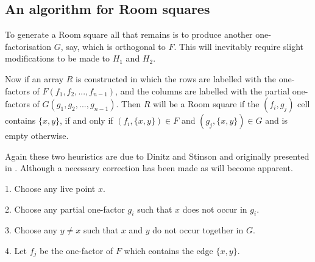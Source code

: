 \documentclass[
  11pt,
  a4paper]{book}\usepackage[]{graphicx}\usepackage[]{xcolor}
\begin{document}
\subsection{An algorithm for Room squares}

To generate a Room square all that remains is to produce
another one-factorisation $G$, say, which is orthogonal to
$F$. This will inevitably require slight modifications to
be made to $H_1$ and $H_2$.

Now if an array $R$ is constructed in which the rows are
labelled with the one-factors of $F(f_1,f_2,...,f_{n-1})$,
and the columns are labelled with the partial one-factors
of $G(g_1,g_2,...,g_{n-1})$. Then $R$ will be a Room square
if the $(f_i,g_j)$ cell contains $\{x,y\}$, if and only if
$(f_i,\{x,y\}) \in F$ and $(g_j,\{x,y\}) \in G$ and is empty
otherwise.

Again these two heuristics are due to Dinitz and Stinson and
originally presented in
\cite{dinitzHillClimbingAlgorithmConstruction1987}.
Although a necessary correction has been made as will
become apparent.

\begin{algorithm}[H]
  1. Choose any live point $x$.

  2. Choose any partial one-factor $g_i$ such that $x$ does
     not occur in $g_i$.

  3. Choose any $y \neq x$ such that $x$ and $y$ do not occur
     together in $G$.

  4. Let $f_j$ be the one-factor of $F$ which contains the 
     edge $\{x, y\}$.
     
\caption{$OH_1$}
\end{algorithm}
\end{document}
